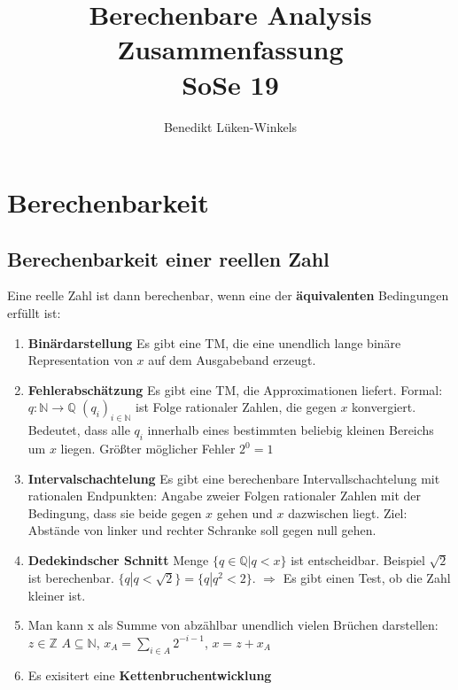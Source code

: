 \documentclass[ngerman]{scrartcl}
\title{Berechenbare Analysis \\ Zusammenfassung \\ SoSe 19}
\author{Benedikt Lüken-Winkels}
\begin{document}
\maketitle
\tableofcontents

\newpage

%
%
\section{Berechenbarkeit}

\subsection{Berechenbarkeit einer reellen Zahl}
Eine reelle Zahl ist dann berechenbar, wenn eine der \textbf{äquivalenten} Bedingungen erfüllt ist:
\begin{enumerate}
  \item \textbf{Binärdarstellung} Es gibt eine TM, die eine unendlich lange binäre Representation von $ x $ auf dem Ausgabeband erzeugt.
  \item \textbf{Fehlerabschätzung} Es gibt eine TM, die Approximationen liefert. Formal: $ q:\mathbb{N}\rightarrow \mathbb{Q} $ $ (q_{i})_{i \in \mathbb{N}} $ ist Folge rationaler Zahlen, die gegen $ x $ konvergiert. Bedeutet, dass alle $ q_i $ innerhalb eines bestimmten beliebig kleinen Bereichs um $ x $ liegen. Größter möglicher Fehler $ 2^0 = 1 $
  \item \textbf{Intervalschachtelung} Es gibt eine berechenbare Intervallschachtelung mit rationalen Endpunkten: Angabe zweier Folgen rationaler Zahlen mit der Bedingung, dass sie beide gegen $ x $ gehen und $ x $ dazwischen liegt. Ziel: Abstände von linker und rechter Schranke soll gegen null gehen.
  \item \textbf{Dedekindscher Schnitt} Menge $ \{q \in \mathbb{Q} | q < x \} $ ist entscheidbar. Beispiel $ \sqrt{2} $ ist berechenbar. $ \{ q | q < \sqrt{2} \} = \{ q | q^2 < 2\}$. $ \Rightarrow $ Es gibt einen Test, ob die Zahl kleiner ist.
  \item Man kann x als Summe von abzählbar unendlich vielen Brüchen darstellen: $ z \in \mathbb{Z} $ $ A \subseteq \mathbb{N} $, $ x_A = \sum_{i \in A} 2^{-i-1} $, $ x = z + x_A $
  \item Es exisitert eine \textbf{Kettenbruchentwicklung}
 \end{enumerate}
\end{document}
